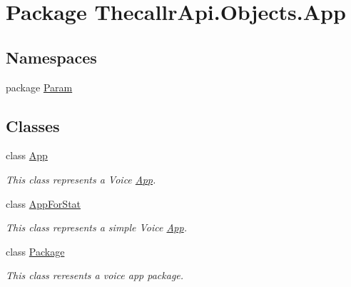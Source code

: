 \hypertarget{namespace_thecallr_api_1_1_objects_1_1_app}{\section{Package Thecallr\+Api.\+Objects.\+App}
\label{namespace_thecallr_api_1_1_objects_1_1_app}
}
\subsection*{Namespaces}
\begin{DoxyCompactItemize}
\item 
package \hyperlink{namespace_thecallr_api_1_1_objects_1_1_app_1_1_param}{Param}
\end{DoxyCompactItemize}
\subsection*{Classes}
\begin{DoxyCompactItemize}
\item 
class \hyperlink{class_thecallr_api_1_1_objects_1_1_app_1_1_app}{App}
\begin{DoxyCompactList}\small\item\em This class represents a Voice \hyperlink{class_thecallr_api_1_1_objects_1_1_app_1_1_app}{App}. \end{DoxyCompactList}\item 
class \hyperlink{class_thecallr_api_1_1_objects_1_1_app_1_1_app_for_stat}{App\+For\+Stat}
\begin{DoxyCompactList}\small\item\em This class represents a simple Voice \hyperlink{class_thecallr_api_1_1_objects_1_1_app_1_1_app}{App}. \end{DoxyCompactList}\item 
class \hyperlink{class_thecallr_api_1_1_objects_1_1_app_1_1_package}{Package}
\begin{DoxyCompactList}\small\item\em This class reresents a voice app package. \end{DoxyCompactList}\end{DoxyCompactItemize}
